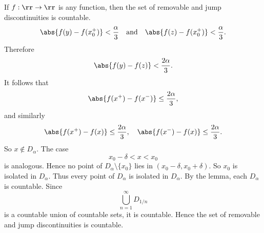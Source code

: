 \begin{theorem}{
    If $f:\rr\to\rr$ is any function, then the set of removable and jump discontinuities is countable.
}
    \[
        \abs{f(y)-f(x_0^+)} < \frac{\alpha}{3}
        \quad\text{and}\quad
        \abs{f(z)-f(x_0^+)} < \frac{\alpha}{3}.
    \]
    Therefore
    \[
        \abs{f(y)-f(z)} < \frac{2\alpha}{3}.
    \]
    It follows that
    \[
        \abs{f(x^+) - f(x^-)} \leq \frac{2\alpha}{3},
    \]
    and similarly
    \[
        \abs{f(x^+) - f(x)} \leq \frac{2\alpha}{3},
        \quad
        \abs{f(x^-) - f(x)} \leq \frac{2\alpha}{3}.
    \]
    So $x\notin D_\alpha$.
    The case
    \[
        x_0-\delta < x < x_0
    \]
    is analogous.
    Hence no point of $D_\alpha\setminus\{x_0\}$ lies in $(x_0-\delta,x_0+\delta)$.
    So $x_0$ is isolated in $D_\alpha$.
    Thus every point of $D_\alpha$ is isolated in $D_\alpha$.
    By the lemma, each $D_\alpha$ is countable.
    Since
    \[
        \bigcup_{n=1}^\infty D_{1/n}
    \]
    is a countable union of countable sets, it is countable.
    Hence the set of removable and jump discontinuities is countable.
\end{theorem}